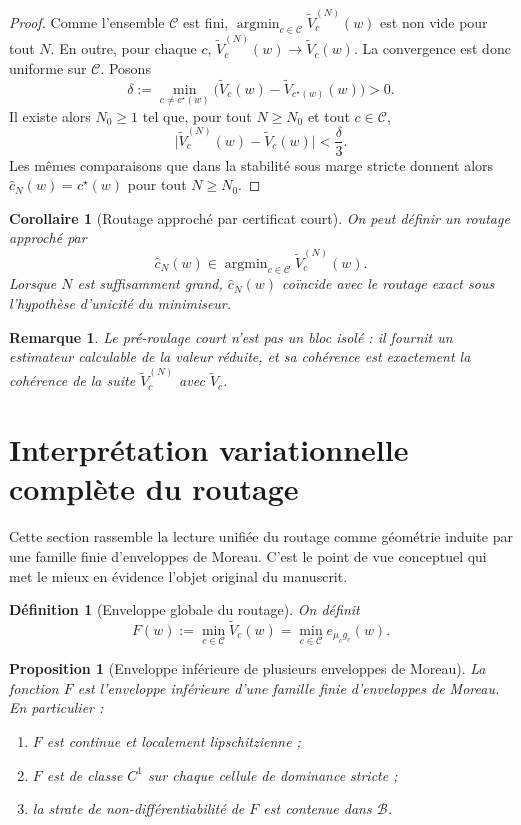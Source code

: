 \documentclass[11pt,a4paper]{article}
\newtheorem{definition}{Définition}[section]
\newtheorem{proposition}{Proposition}[section]
\newtheorem{corollary}{Corollaire}[section]
\newtheorem{remark}{Remarque}[section]
\DeclareMathOperator{\argmin}{argmin}
\newcommand{\Ccal}{\mathcal C}
\begin{document}
\begin{proof}
Comme l'ensemble \(\Ccal\) est fini, \(\argmin_{c\in\Ccal}\widetilde V_c^{(N)}(w)\) est non vide pour tout \(N\). En outre, pour chaque \(c\), \(\widetilde V_c^{(N)}(w)\to \widetilde V_c(w)\). La convergence est donc uniforme sur \(\Ccal\). Posons
\[
\delta:=\min_{c\neq c^\star(w)}\bigl(\widetilde V_c(w)-\widetilde V_{c^\star(w)}(w)\bigr)>0.
\]
Il existe alors \(N_0\ge 1\) tel que, pour tout \(N\ge N_0\) et tout \(c\in\Ccal\),
\[
\bigl|\widetilde V_c^{(N)}(w)-\widetilde V_c(w)\bigr|<\frac{\delta}{3}.
\]
Les mêmes comparaisons que dans la stabilité sous marge stricte donnent alors \(\hat c_N(w)=c^\star(w)\) pour tout \(N\ge N_0\).
\end{proof}

\begin{corollary}[Routage approché par certificat court]
On peut définir un routage approché par
\[
\hat c_N(w)\in\argmin_{c\in\Ccal}\widetilde V_c^{(N)}(w).
\]
Lorsque \(N\) est suffisamment grand, \(\hat c_N(w)\) coïncide avec le routage exact sous l'hypothèse d'unicité du minimiseur.
\end{corollary}

\begin{remark}
Le pré-roulage court n'est pas un bloc isolé : il fournit un estimateur calculable de la valeur réduite, et sa cohérence est exactement la cohérence de la suite \(\widetilde V_c^{(N)}\) avec \(\widetilde V_c\).
\end{remark}

\section{Interprétation variationnelle complète du routage}

Cette section rassemble la lecture unifiée du routage comme géométrie induite par une famille finie d'enveloppes de Moreau. C'est le point de vue conceptuel qui met le mieux en évidence l'objet original du manuscrit.

\begin{definition}[Enveloppe globale du routage]
On définit
\[
F(w):=\min_{c\in\Ccal}\widetilde V_c(w)
=
\min_{c\in\Ccal}e_{\mu_c g_c}(w).
\]
\end{definition}

\begin{proposition}[Enveloppe inférieure de plusieurs enveloppes de Moreau]
La fonction \(F\) est l'enveloppe inférieure d'une famille finie d'enveloppes de Moreau. En particulier :
\begin{enumerate}[leftmargin=2em]
\item \(F\) est continue et localement lipschitzienne ;
\item \(F\) est de classe \(C^1\) sur chaque cellule de dominance stricte ;
\item la strate de non-différentiabilité de \(F\) est contenue dans \(\mathcal B\).
\end{enumerate}
\end{proposition}
\end{document}
